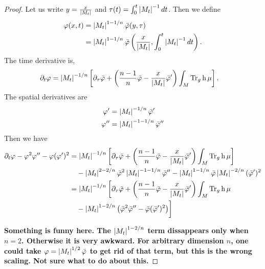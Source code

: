 \documentclass{amsart}
\begin{document}
\begin{proof}
Let us write \(y = \frac{x}{\left|{M_t}\right|}\) and \(\tau(t) = \int_0^t \left|{M_t}\right|^{-1} dt\). Then we define
\[
\begin{split}
\varphi(x, t) &= \left|{M_t}\right|^{1-1/n} \bar{\varphi} (y, \tau) \\
&= \left|{M_t}\right|^{1-1/n} \bar{\varphi} \left(\frac{x}{\left|{M_t}\right|}, \int_0^t \left|{M_t}\right|^{-1} dt\right).
\end{split}
\]
The time derivative is,
\[
\begin{split}
\partial_t \varphi &= \left|{M_t}\right|^{-1/n}\left[\partial_{\tau} \bar{\varphi} + \left(\frac{n-1}{n} \bar{\varphi} - \frac{x}{\left|{M_t}\right|} \bar{\varphi}'\right) \int_M \operatorname{Tr}_g \operatorname{h} \mu \right].
\end{split}
\]
The spatial derivatives are
\begin{align*}
\varphi' &= \left|{M_t}\right|^{-1/n} \bar{\varphi}' \\
\varphi'' &= \left|{M_t}\right|^{-1-1/n} \bar{\varphi}''
\end{align*}
Then we have
\[
\begin{split}
\partial_t \varphi - \varphi^2 \varphi'' - \varphi(\varphi')^2 &= \left|{M_t}\right|^{-1/n}\left[\partial_{\tau} \bar{\varphi} + \left(\frac{n-1}{n} \bar{\varphi} - \frac{x}{\left|{M_t}\right|} \bar{\varphi}'\right) \int_M \operatorname{Tr}_g \operatorname{h} \mu \right] \\
&\quad - \left|{M_t}\right|^{2-2/n} \bar{\varphi}^2 \left|{M_t}\right|^{-1-1/n} \bar{\varphi}'' - \left|{M_t}\right|^{1-1/n} \bar{\varphi} \left|{M_t}\right|^{-2/n} (\bar{\varphi}')^2 \\
&= \left|{M_t}\right|^{-1/n}\biggl[\partial_{\tau} \bar{\varphi} + \left(\frac{n-1}{n} \bar{\varphi} - \frac{x}{\left|{M_t}\right|} \bar{\varphi}'\right) \int_M \operatorname{Tr}_g \operatorname{h} \mu \\
&\quad - \left|{M_t}\right|^{1-2/n} \left(\bar{\varphi}^2 \bar{\varphi}'' - \bar{\varphi} (\bar{\varphi}')^2\right)\biggr]
\end{split}
\]

\textbf{Something is funny here. The \(\left|{M_t}\right|^{1-2/n}\) term dissappears only when \(n=2\). Otherwise it is very awkward. For arbitrary dimension \(n\), one could take \(\varphi = \left|{M_t}\right|^{1/2} \bar{\varphi}\) to get rid of that term, but this is the wrong scaling. Not sure what to do about this.}


\end{proof}
\end{document}
